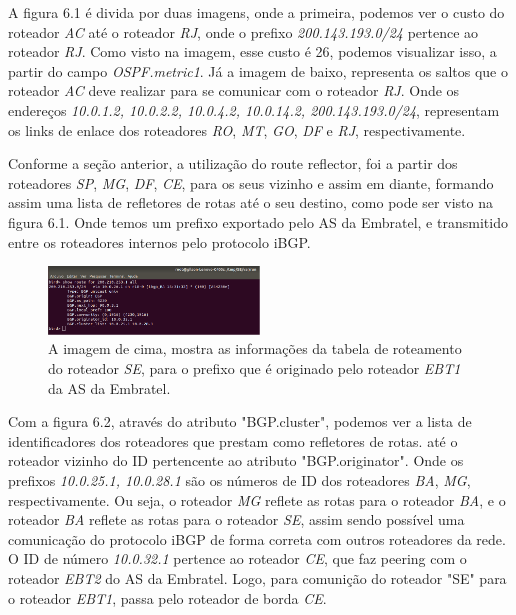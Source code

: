 \documentclass[12pt,a4paper]{report}
\begin{document}
A figura 6.1 \'e divida por duas imagens, onde a primeira, podemos ver o custo do roteador \textit{AC} at\'e o roteador \textit{RJ}, onde o prefixo \textit{200.143.193.0/24} pertence ao roteador \textit{RJ}. Como visto na imagem, esse custo \'e 26, podemos visualizar isso, a partir do campo \textit{OSPF.metric1}. J\'a a imagem de baixo, representa os saltos que o roteador \textit{AC} deve realizar para se comunicar com o roteador \textit{RJ}. Onde os endere\c{c}os \textit{10.0.1.2, 10.0.2.2, 10.0.4.2, 10.0.14.2, 200.143.193.0/24}, representam os links de enlace dos roteadores \textit{RO}, \textit{MT}, \textit{GO}, \textit{DF} e \textit{RJ}, respectivamente.

Conforme a se\c{c}\~ao anterior, a utiliza\c{c}\~ao do route reflector, foi a partir dos roteadores \textit{SP}, \textit{MG}, \textit{DF}, \textit{CE}, para os seus vizinho e assim em diante, formando assim uma lista de refletores de rotas at\'e o seu destino, como pode ser visto na figura 6.1. Onde temos um prefixo exportado pelo AS da Embratel, e transmitido entre os roteadores internos pelo protocolo iBGP.

\begin{figure}[!htb]
 \centering
 \includegraphics[width=0.5\textwidth]{Imagens/ROUTERREFLECTOR}
  \caption{\label{fig:imagem9} A imagem de cima, mostra as informa\c{c}\~oes da tabela de roteamento do roteador \textit{SE}, para o prefixo que \'e originado pelo roteador \textit{EBT1} da AS da Embratel.}
\end{figure}

Com a figura 6.2, atrav\'es do atributo "BGP.cluster", podemos ver a lista de identificadores dos roteadores que prestam como refletores de rotas. at\'e o roteador vizinho do ID pertencente ao atributo "BGP.originator". Onde os prefixos \textit{10.0.25.1, 10.0.28.1} s\~ao os n\'umeros de ID dos roteadores \textit{BA}, \textit{MG}, respectivamente. Ou seja, o roteador \textit{MG} reflete as rotas para o roteador \textit{BA}, e o roteador \textit{BA} reflete as rotas para o roteador \textit{SE}, assim sendo poss\'ivel uma comunica\c{c}\~ao do protocolo iBGP de forma correta com outros roteadores da rede. O ID de n\'umero \textit{10.0.32.1} pertence ao roteador \textit{CE}, que faz peering com o roteador \textit{EBT2} do AS da Embratel. Logo, para comuni\c{c}\~ao do roteador "SE" para o roteador \textit{EBT1}, passa pelo roteador de borda \textit{CE}.
\end{document}
